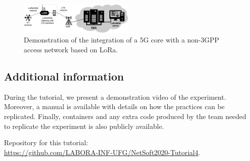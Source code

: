 \begin{figure}[htb] 
 \begin{center}
\includegraphics[width=0.5\textwidth]{figs/demo3.pdf}
  \end{center}
\caption{Demonstration of the integration of a 5G core with a non-3GPP access network based on LoRa.}
\label{fig:demo3}
\end{figure}

\subsection*{Additional information}

During the tutorial, we present a demonstration video of the experiment. Moreover, a manual is available with details on how the practices can be replicated. Finally, containers and any extra code produced by the team needed to replicate the experiment is also publicly available.

Repository for this tutorial:\\
\url{https://github.com/LABORA-INF-UFG/NetSoft2020-Tutorial4}.


